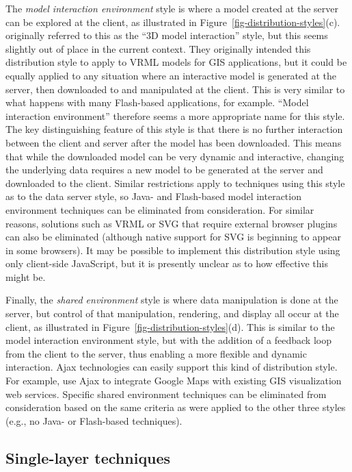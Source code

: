 \documentclass[acmnow]{acmtrans2m}
\begin{document}
The \emph{model interaction environment} style is where a model created
at the server can be explored at the client, as illustrated in
Figure~\ref{fig-distribution-styles}(c). 
originally referred to this as the ``3D model interaction'' style, but
this seems slightly out of place in the current context. They originally
intended this distribution style to apply to VRML models for GIS
applications, but it could be equally applied to any situation where an
interactive model is generated at the server, then downloaded to and
manipulated at the client. This is very similar to what happens with
many Flash-based applications, for example. ``Model interaction
environment'' therefore seems a more appropriate name for this style.
The key distinguishing feature of this style is that there is no further
interaction between the client and server after the model has been
downloaded. This means that while the downloaded model can be very
dynamic and interactive, changing the underlying data requires a new
model to be generated at the server and downloaded to the client.
Similar restrictions apply to techniques using this style as to the data
server style, so Java- and Flash-based model interaction environment
techniques can be eliminated from consideration. For similar reasons,
solutions such as VRML or SVG that require external browser plugins can
also be eliminated (although native support for SVG is beginning to
appear in some browsers). It may be possible to implement this
distribution style using only client-side JavaScript, but it is
presently unclear as to how effective this might be.

Finally, the \emph{shared environment} style is where data manipulation
is done at the server, but control of that manipulation, rendering, and
display all occur at the client, as illustrated in
Figure~\ref{fig-distribution-styles}(d). This is similar to the model
interaction environment style, but with the addition of a feedback loop
from the client to the server, thus enabling a more flexible and dynamic
interaction. Ajax technologies \cite{Garr-JJ-2005-Ajax} can easily
support this kind of distribution style. For example,
 use Ajax to integrate Google Maps with
existing GIS visualization web services. Specific shared environment
techniques can be eliminated from consideration based on the same
criteria as were applied to the other three styles (e.g., no Java- or
Flash-based techniques).


\subsection{Single-layer techniques}
\label{sec-image-gen}
\end{document}
